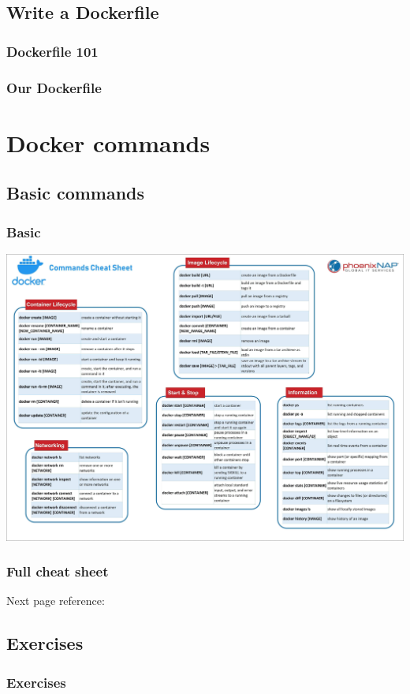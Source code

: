 \documentclass{beamer}
\begin{document}
\subsection{Write a Dockerfile}
\begin{frame}
    \frametitle{Dockerfile 101}
\end{frame}

\begin{frame}
    \frametitle{Our Dockerfile}
\end{frame}

\section{Docker commands}
\subsection{Basic commands}
\begin{frame}
    \frametitle{Basic}
    \centering\includegraphics[height=0.9\textheight]{Docker commands cheat sheet by PhoenixNAP.jpeg}
    \cite{small_chear_sheet}
\end{frame}

\begin{frame}
    \frametitle{Full cheat sheet}
    Next page reference: \cite{cheat_sheet_full}
\end{frame}
{

}

\subsection{Exercises}
\begin{frame}
    \frametitle{Exercises}
\end{frame}
\end{document}
